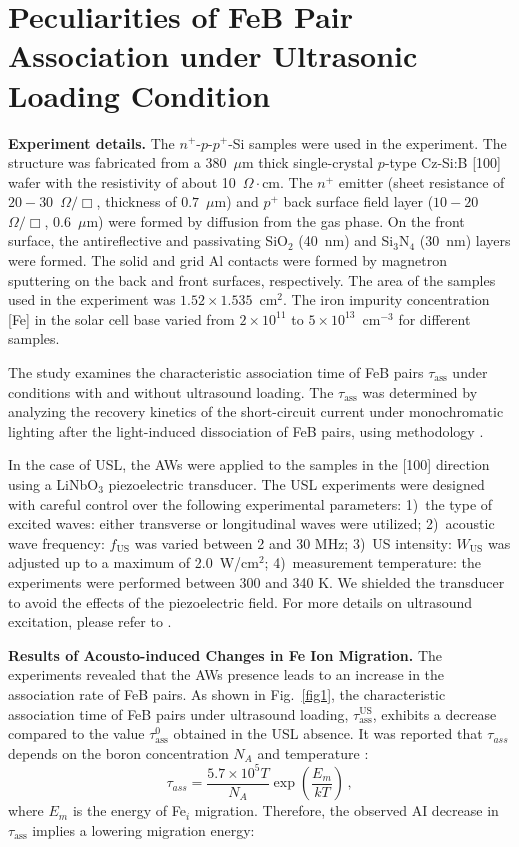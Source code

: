 \documentclass{ttp}
\begin{document}
\section{Peculiarities of FeB Pair Association under Ultrasonic Loading Condition}

\noindent \textbf{Experiment details.}
The $n^+$-$p$-$p^+$-Si samples were used in the experiment.
The structure was fabricated from a 380~$\mu$m thick single-crystal
$p$-type Cz-Si:B [100] wafer
with the resistivity of about 10~$\Omega\cdot$cm.
The $n^+$ emitter (sheet resistance of $20-30$~$\Omega/\Box$,
thickness of $0.7$~$\mu$m) and $p^+$ back surface field layer ($10-20$~$\Omega/\Box$, $0.6$~$\mu$m) were formed by diffusion from the gas phase.
On the front surface, the antireflective and passivating SiO$_2$ (40~nm) and Si$_3$N$_4$ (30~nm) layers
were formed.
The solid and grid Al contacts were formed by magnetron sputtering on the back and front surfaces, respectively.
The area of the samples used in the experiment was $1.52\times1.535$~cm$^2$.
The iron impurity concentration [Fe] in the solar cell base varied from $2\times10^{11}$ to $5\times10^{13}$~cm$^{-3}$ for different samples.

The study examines the characteristic association time of FeB pairs $\tau_\mathrm{ass}$ under conditions with and without ultrasound loading.
The $\tau_\mathrm{ass}$ was determined by analyzing the recovery kinetics of the  short-circuit current under monochromatic lighting 
after  the light-induced dissociation of FeB pairs, using methodology \cite{Olikh2021JAP, Olikh2022:JMatSci}.

In the case of USL, the AWs were applied to the samples in the [100] direction using a LiNbO$_3$ piezoelectric transducer.
The USL experiments were designed with careful control over the following experimental parameters:
1)~the type of excited waves: either transverse or longitudinal waves were utilized;
2)~acoustic wave frequency: $f_\mathrm{US}$ was varied between 2 and 30 MHz;
3)~US intensity: $W_\mathrm{US}$ was adjusted up to a maximum of 2.0~W/cm$^2$;
4)~measurement temperature: the experiments were performed between 300 and 340 K.
We shielded the transducer to avoid the effects of the piezoelectric field.
For more details on ultrasound excitation, please refer to \cite{Olikh2021JAP, Olikh2022:JMatSci}.

\noindent \textbf{Results of Acousto-induced Changes in Fe Ion Migration.}
The experiments revealed that the AWs presence leads to an increase in the association rate of FeB pairs.
As shown in Fig.~\ref{fig1}, the characteristic association time of FeB pairs 
under ultrasound loading, $\tau_\mathrm{ass}^\mathrm{US}$, 
exhibits a decrease compared to the value $\tau_\mathrm{ass}^0$ obtained in the USL absence.
It was reported that $\tau_{ass}$ depends on the boron concentration $N_A$
and temperature \cite{FeBAssJAP2014}:
\begin{equation}
\label{eqTass}
\tau_{ass}=\frac{5.7\times10^5T}{N_A}\exp\left(\frac{E_m}{kT}\right)\,,
\end{equation}
where
$E_m$ is the energy of Fe$_i$ migration.
Therefore, the observed AI decrease in $\tau_\mathrm{ass}$ implies a lowering migration energy:
\end{document}
